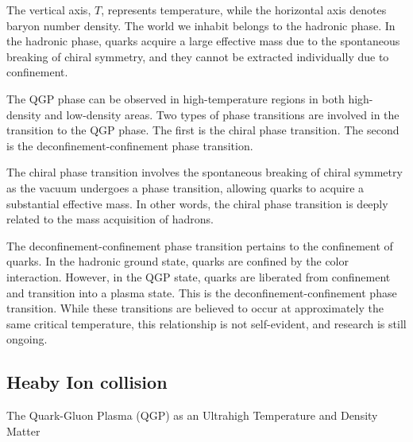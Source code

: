         The vertical axis, \( T \), represents temperature, while the horizontal axis denotes baryon number density. The world we inhabit belongs to the hadronic phase. In the hadronic phase, quarks acquire a large effective mass due to the spontaneous breaking of chiral symmetry, and they cannot be extracted individually due to confinement.  
        
        The QGP phase can be observed in high-temperature regions in both high-density and low-density areas. Two types of phase transitions are involved in the transition to the QGP phase. The first is the chiral phase transition. The second is the deconfinement-confinement phase transition.  
        
        The chiral phase transition involves the spontaneous breaking of chiral symmetry as the vacuum undergoes a phase transition, allowing quarks to acquire a substantial effective mass. In other words, the chiral phase transition is deeply related to the mass acquisition of hadrons.  
        
        The deconfinement-confinement phase transition pertains to the confinement of quarks. In the hadronic ground state, quarks are confined by the color interaction. However, in the QGP state, quarks are liberated from confinement and transition into a plasma state. This is the deconfinement-confinement phase transition. While these transitions are believed to occur at approximately the same critical temperature, this relationship is not self-evident, and research is still ongoing.  
        
    \subsection{Heaby Ion collision}
        The Quark-Gluon Plasma (QGP) as an Ultrahigh Temperature and Density Matter

